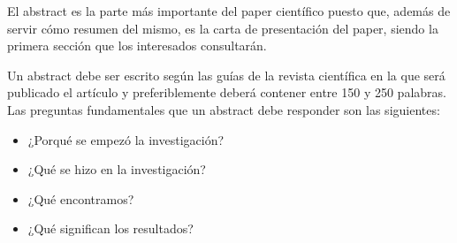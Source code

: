 El abstract es la parte más importante del paper científico puesto que, además de servir cómo resumen del mismo, es la carta de presentación del paper, siendo la primera sección que los interesados consultarán.

Un abstract debe ser escrito según las guías de la revista científica en la que será publicado el artículo y preferiblemente deberá contener entre 150 y 250 palabras. Las preguntas fundamentales que un abstract debe responder son las siguientes:

\begin{itemize}

    \item ¿Porqué se empezó la investigación?
    \item ¿Qué se hizo en la investigación?
    \item ¿Qué encontramos?
    \item ¿Qué significan los resultados?

\end{itemize}



